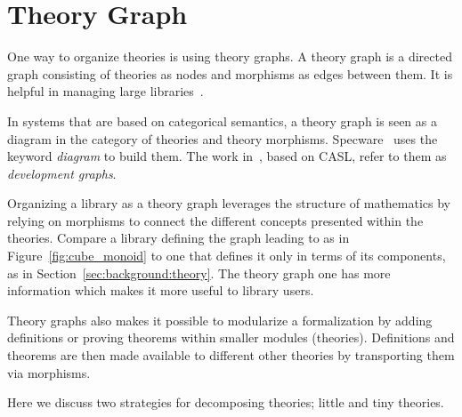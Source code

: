 
\section{Theory Graph}\label{sec:background:theorygraph}
One way to organize theories is using theory graphs. A theory graph is a directed graph consisting of theories as nodes and morphisms as edges between them. It is helpful in managing large libraries~\cite{kohlhase2010towards}.

In systems that are based on categorical semantics, a theory graph is seen as a diagram in the category of theories and theory morphisms. Specware~\cite{Smith99} uses the keyword \emph{diagram} to build them. The work in~\cite{developmentGraph2000}, based on CASL, refer to them as \emph{development graphs}. 

Organizing a library as a theory graph leverages the structure of mathematics by relying on morphisms to connect the different concepts presented within the theories. Compare a library defining the graph leading to   as in Figure~\ref{fig:cube_monoid} to one that defines it only in terms of its components, as in Section~\ref{sec:background:theory}. The theory graph one has more information which makes it more useful to library users. 

Theory graphs also makes it possible to modularize a formalization by adding definitions or proving theorems within smaller modules (theories). Definitions and theorems are then made available to different other theories by transporting them via morphisms. 

Here we discuss two strategies for decomposing theories; little and tiny theories.  

  
